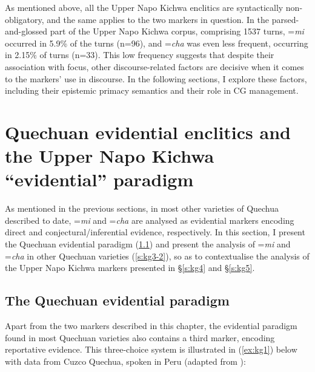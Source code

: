 \documentclass[output=paper]{langscibook}
\begin{document}
As mentioned above, all the Upper Napo Kichwa enclitics are syntactically non-obligatory, and the same applies to the two markers in question. In the parsed-and-glossed part of the Upper Napo Kichwa corpus, comprising 1537 turns, =\textit{mi} occurred in 5.9\% of the turns (n=96), and =\textit{cha} was even less frequent, occurring in 2.15\% of turns (n=33). This low frequency suggests that despite their association with focus, other discourse-related factors are decisive when it comes to the markers’ use in discourse. In the following sections, I explore these factors, including their epistemic primacy semantics and their role in CG management.  

\section{Quechuan evidential enclitics and the Upper Napo Kichwa “evidential” paradigm}\label{s:kg3}

As mentioned in the previous sections, in most other varieties of Quechua described to date, =\textit{mi} and =\textit{cha} are analysed as evidential markers encoding direct and conjectural/inferential evidence, respectively. In this section, I present the Quechuan evidential paradigm (\ref{s:kg3-1}‎) and present the analysis of =\textit{mi} and =\textit{cha} in other Quechuan varieties (\ref{s:kg3-2}), so as to contextualise the analysis of the Upper Napo Kichwa markers presented in §\ref{s:kg4}‎ and §‎\ref{s:kg5}. 

\subsection{The Quechuan evidential paradigm}\label{s:kg3-1}

Apart from the two markers described in this chapter, the evidential paradigm found in most Quechuan varieties also contains a third marker, encoding reportative evidence. This three-choice system is illustrated in (\ref{ex:kg1}) below with data from Cuzco Quechua, spoken in Peru (adapted from \citealt[122]{Faller2002}):
\end{document}
